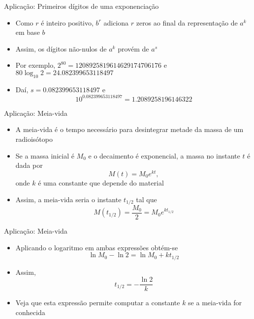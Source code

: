\begin{frame}[fragile]{Aplicação: Primeiros dígitos de uma exponenciação}

    \begin{itemize}
        \item Como $r$ é inteiro positivo, $b^r$ adiciona $r$ zeros ao final da representação de $a^k$ em base $b$

        \item Assim, os dígitos não-nulos de $a^k$ provém de $a^s$

        \item Por exemplo, $2^{80} = 1208925819614629174706176$ e $80\log_{10} 2 = 24.082399653118497$

        \item Daí, $s = 0.082399653118497$ e 
            $$
                10^{0.082399653118497} = 1.2089258196146322
            $$
    \end{itemize}

\end{frame}

\begin{frame}[fragile]{Aplicação: Meia-vida}

    \begin{itemize}
        \item A meia-vida é o tempo necessário para desintegrar metade da massa de um radioisótopo

        \item Se a massa inicial é $M_0$ e o decaimento é exponencial, a massa no instante $t$ é dada por
            $$
                M(t) = M_0e^{kt},
            $$
        onde $k$ é uma constante que depende do material

        \item Assim, a meia-vida seria o instante $t_{1/2}$ tal que
            $$
                M(t_{1/2}) = \frac{M_0}{2} = M_0e^{kt_{1/2}}
            $$
    \end{itemize}

\end{frame}

\begin{frame}[fragile]{Aplicação: Meia-vida}

    \begin{itemize}
        \item Aplicando o logaritmo em ambas expressões obtém-se
            $$
                \ln M_0 - \ln 2 = \ln M_0 + kt_{1/2}
            $$

        \item Assim,
            $$
                t_{1/2} = - \frac{\ln 2}{k}
            $$

        \item Veja que esta expressão permite computar a constante $k$ se a meia-vida for conhecida
    \end{itemize}

\end{frame}

